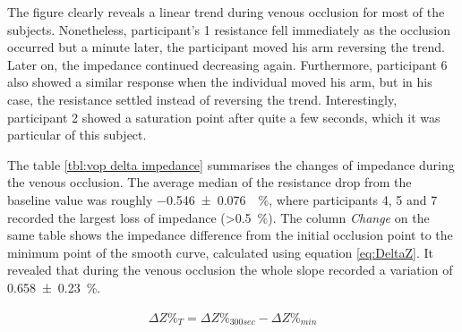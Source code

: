 The figure clearly reveals a linear trend during venous occlusion for most of the subjects. Nonetheless, participant's 1 resistance fell immediately as the occlusion occurred but a minute later, the participant moved his arm reversing the trend. Later on, the impedance continued decreasing again. Furthermore,  participant 6 also showed a similar response when the individual moved his arm, but in his case, the resistance settled instead of reversing the trend. Interestingly, participant 2 showed a saturation point after quite a few seconds, which it was particular of this subject. 


The table \ref{tbl:vop delta impedance} summarises the changes of impedance during the venous occlusion. The average median of the resistance drop from the baseline value was roughly \SI{-0.546(0076)}{\Delta \%}, where participants 4, 5 and 7 recorded the largest loss of impedance (>\SI{0.5}{\%}). The column \textit{Change} on the same table shows the impedance difference from the initial occlusion point to the minimum point of the smooth curve, calculated using equation \ref{eq:DeltaZ}. It revealed that during the venous occlusion the whole slope recorded a variation of \SI{0.658(0230)}{\percent}.

\begin{align}
	\label{eq:DeltaZ}
	\Delta Z\%_T = \Delta Z\%_{300 sec} - \Delta Z\%_{min}
\end{align}

